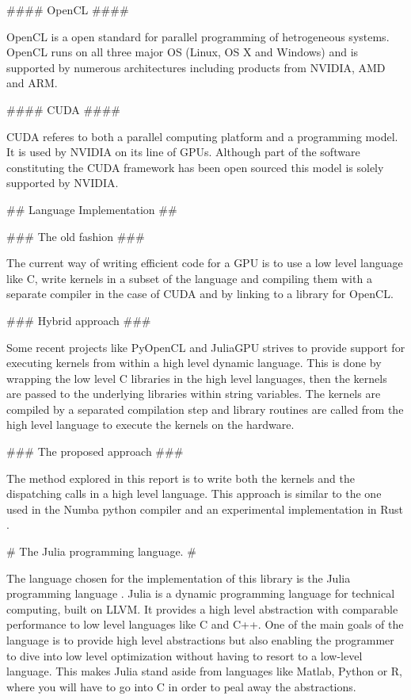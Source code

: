 \begin{markdown}
#### OpenCL ####

\gls{OpenCL} is a open standard for parallel programming of
hetrogeneous systems. OpenCL runs on all three major OS (Linux, OS X
and Windows) and is supported by numerous architectures including
products from NVIDIA, \gls{AMD} and ARM.

#### CUDA ####

\gls{CUDA} referes to both a parallel computing platform and a
programming model. It is used by NVIDIA on its line of GPUs. Although
part of the software constituting the \gls{CUDA} framework has been
open sourced this model is solely supported by NVIDIA.

## Language Implementation ##

### The old fashion ###

The current way of writing efficient code for a \gls{GPU} is to use a
low level language like C, write kernels in a subset of the language
and compiling them with a separate compiler in the case of \gls{CUDA}
and by linking to a library for \gls{OpenCL}.

### Hybrid approach ###

Some recent projects like PyOpenCL \cite{pyopencl} and JuliaGPU
\cite{JuliaGPU} strives to provide support for executing kernels from
within a high level dynamic language. This is done by wrapping the low
level C libraries in the high level languages, then the kernels are
passed to the underlying libraries within string variables. The
kernels are compiled by a separated compilation step and library
routines are called from the high level language to execute the
kernels on the hardware.

### The proposed approach ###

The method explored in this report is to write both the kernels and
the dispatching calls in a high level language. This approach is
similar to the one used in the Numba python compiler \cite{numba} and
an experimental implementation in Rust \cite{rustgpu}.

# The Julia programming language. #

The language chosen for the implementation of this library is the
Julia programming language \cite{julia}. Julia is a dynamic
programming language for technical computing, built on \gls{LLVM}. It
provides a high level abstraction with comparable performance to low
level languages like C and C++. One of the main goals of the language
is to provide high level abstractions but also enabling the programmer
to dive into low level optimization without having to resort to a
low-level language. This makes Julia stand aside from languages like
Matlab, Python or R, where you will have to go into C in order to peal
away the abstractions.


\end{markdown}
